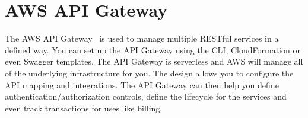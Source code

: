 \section{AWS API Gateway}

The AWS API Gateway~\cite{hid-sp18-518-AWS-APIGateway} is used to manage
multiple RESTful services in a defined way. You can set up the API Gateway
using the CLI, CloudFormation or even Swagger templates. The API Gateway is
serverless and AWS will manage all of the underlying infrastructure for you. 
The design allows you to configure the API mapping and integrations. The API 
Gateway can then help you define authentication/authorization controls, 
define the lifecycle for the services and even track transactions for uses
like billing.










